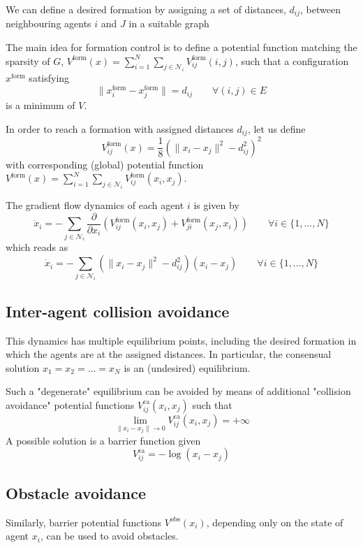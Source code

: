 \documentclass{book}
\theoremstyle{theoremv2}
\theoremstyle{defv2}
\theoremstyle{remark}
\theoremstyle{remark}
\theoremstyle{definition}
\theoremstyle{definition}
\begin{document}
 We can define a desired formation by assigning a set of distances, $d_{ij}$, between neighbouring agents $i$ and $J$ in a suitable graph 
 
 The main idea for formation control is to define a potential function matching the sparsity of $G$, $V^{\text{form}}(x) = \sum_{i=1}^{N}\sum_{j\in\mathcal{N}_i}V_{ij}^{\text{form}}(i,j)$, such that a configuration $x^{\text{form}}$ satisfying 
 \[
     \|x_i^{\text{form}}-x_j^{\text{form}}\| = d_{ij} \qquad \forall (i,j)\in E
 \]
 is a minimum of $V$.

 In order to reach a formation with assigned distances $d_{ij}$, let us define 
 \[
     V_{ij}^{\text{form}}(x) = \displaystyle\frac{1}{8} \left(\|x_i-x_j\|^2-d_{ij}^2\right)^2
 \]
 with corresponding (global) potential function $V^{\text{form}}(x) = \displaystyle\sum_{i=1}^{N}\displaystyle\sum_{j\in\mathcal{N}_i}V_{ij}^\text{form}(x_i,x_j)$.

 The gradient flow dynamics of each agent $i$ is given by 
 \[
     \dot{x}_i = - \displaystyle\sum_{j\in\mathcal{N}_i}\displaystyle\frac{\partial}{\partial x_i} \left(V_{ij}^\text{form}(x_i,x_j)+V_{ji}^{\text{form}}(x_j,x_i)\right) \qquad \forall i \in \{1,\dots,N\}
 \]
 which reads as 
 \[
     \dot{x}_i = - \displaystyle\sum_{j\in\mathcal{N}_i} \left(\|x_i-x_j\|^2-d_{ij}^2\right)(x_i-x_j) \qquad \forall i \in \{1,\dots,N\}
 \]

 \subsection{Inter-agent collision avoidance}
This dynamics has multiple equilibrium points, including the desired formation in which the agents are at the assigned distances. In particular, the consensual solution $x_1=x_2=\dots=x_N$ is an (undesired) equilibrium.

Such a "degenerate" equilibrium can be avoided by means of additional "collision avoidance" potential functions $V_{ij}^\text{ca}(x_i,x_j)$ such that 
\[
    \lim_{\|x_i-x_j\|\to 0} V_{ij}^\text{ca}(x_i,x_j)=+\infty
\]
A possible solution is a barrier function given 
\[
    V_{ij}^\text{ca} = -\log(x_i-x_j)
\]

\subsection{Obstacle avoidance}
Similarly, barrier potential functions $V^\text{obs}(x_i)$, depending only on the state of agent $x_i$, can be used to avoid obstacles. 
\end{document}
